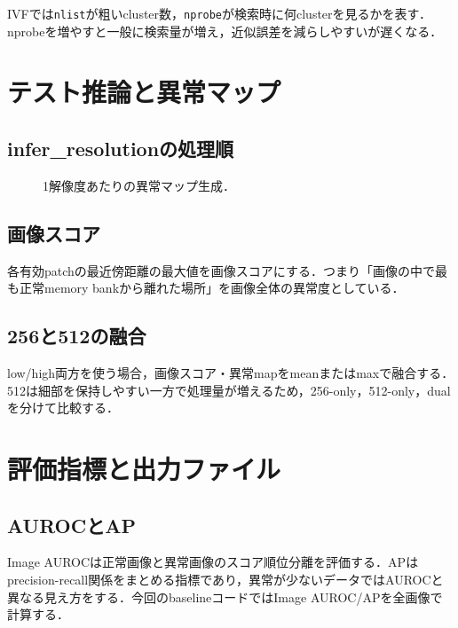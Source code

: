 \documentclass[a4paper,11pt]{ltjsreport}
\begin{document}
IVFでは\texttt{nlist}が粗いcluster数，\texttt{nprobe}が検索時に何clusterを見るかを表す．nprobeを増やすと一般に検索量が増え，近似誤差を減らしやすいが遅くなる．

\chapter{テスト推論と異常マップ}

\section{infer\_resolutionの処理順}
\begin{figure}[H]
\centering
{}
\caption{1解像度あたりの異常マップ生成．}
\end{figure}

\section{画像スコア}
各有効patchの最近傍距離の最大値を画像スコアにする．つまり「画像の中で最も正常memory bankから離れた場所」を画像全体の異常度としている．

\section{256と512の融合}
low/high両方を使う場合，画像スコア・異常mapをmeanまたはmaxで融合する．512は細部を保持しやすい一方で処理量が増えるため，256-only，512-only，dualを分けて比較する．

\chapter{評価指標と出力ファイル}

\section{AUROCとAP}
Image AUROCは正常画像と異常画像のスコア順位分離を評価する．APはprecision-recall関係をまとめる指標であり，異常が少ないデータではAUROCと異なる見え方をする．今回のbaselineコードではImage AUROC/APを全画像で計算する．
\end{document}
